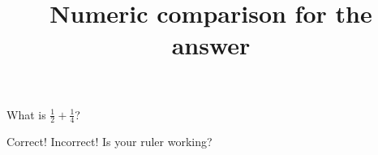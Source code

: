 \documentclass[hidesidemenu]{webquiz}
\title{Numeric comparison for the answer}
\begin{document}
  \begin{question}     %
      What is $\frac12+\frac14$?

     \whenRight Correct!
     \whenWrong Incorrect! Is your ruler working?
  \end{question}
\end{document}

